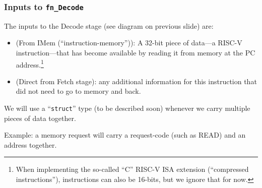
\begin{frame}
\frametitle{Inputs to {\tt fn\_Decode}}

\footnotesize

The inputs to the Decode stage (see diagram on previous slide) are:

\vspace{1ex}

\begin{itemize}

 \item (From IMem (``instruction-memory'')): A 32-bit piece of data---a
 RISC-V instruction---that has become available by reading it from
 memory at the PC address.\footnote{When
 implementing the so-called ``C'' RISC-V ISA extension (``compressed
 instructions''), instructions can also be 16-bits, but we
 ignore that for now.}

 \PAUSE{\vspace{4ex}}

 \item (Direct from Fetch stage): any additional information for this
     instruction that did not need to go to memory and back.

\end{itemize}

\PAUSE{\vspace{4ex}}

We will use a {\BSV} ``{\tt struct}'' type (to be described soon)
whenever we carry multiple pieces of data together.

\vspace{1ex}

Example: a memory request will carry a request-code (such as READ) and
an address together.

\end{frame}


